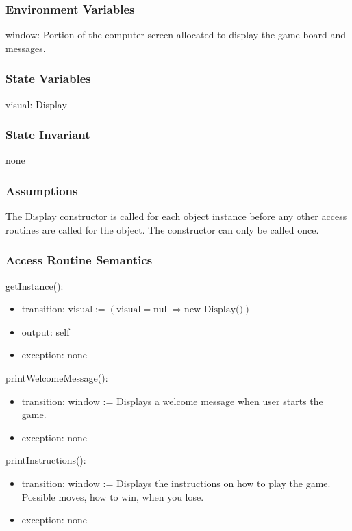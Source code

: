 \documentclass[12pt]{article}
\begin{document}
\subsubsection* {Environment Variables}
window: Portion of the computer screen allocated to display the game board and messages.

\subsubsection* {State Variables}

visual: Display

\subsubsection* {State Invariant}

none

\subsubsection* {Assumptions}

The Display constructor is called for each object instance before any other access routines are called for the object. The constructor can only be called once.

\subsubsection* {Access Routine Semantics}

\noindent getInstance():
\begin{itemize}
\item transition: $\text{visual}:=(\text{visual}=\text{null}\Rightarrow\text{new Display()}) $
\item output: self
\item exception: none
\end{itemize}

\noindent printWelcomeMessage():
\begin{itemize}
\item transition: window := Displays a welcome message when user starts the game.
\item exception: none
\end{itemize}

\noindent printInstructions():
\begin{itemize}
\item transition: window := Displays the instructions on how to play the game. Possible moves, how to win, when you lose.
\item exception: none
\end{itemize}
\end{document}
